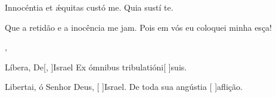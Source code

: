 {{\item {}Innocéntia et ǽquitas custó me. {\ResponsoriumC} Quia sustí te.}%
{\item {}Que a retidão e a inocência me jam. {\ResponsoriumC} Pois em vós eu coloquei minha esça!},
{\item {}Líbera, De[, ]{Is}rael {\ResponsoriumC} Ex ómnibus tribulatióni[ ]{su}is.}%
{\item {}Libertai, ó Senhor Deus, [ ]{Is}rael. {\ResponsoriumC} De toda sua angústia [ ]{a}flição.}
}